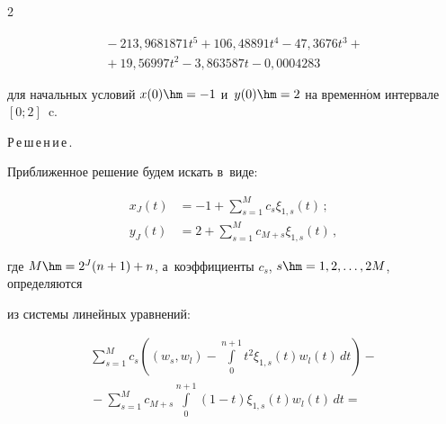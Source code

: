 \begin{multicols}{2}
\noindent


\begin{multline*}


{}-213{,}9681871 t^5 + 106{,}48891 t^4-47{,}3676 t^3+{}\\


{}+19{,}56997 t^2-3{,}863587 t-0{,}0004283


\end{multline*}










\noindent


для начальных условий $x(0)\hm=-1$ и~$y(0)\hm=2$ на вре\-мен\-н$\acute{\mbox{о}}$м интервале $[0;2]$~c.





\smallskip











\noindent


Р\,е\,ш\,е\,н\,и\,е\,.\ \ 


Приближенное решение будем искать в~виде: 


\begin{align*}


x_{J}(t)&=-1+\sum\limits_{s=1}^M 


c_{s} {\xi}_{1,s}(t)\,;\\


y_{J}(t)&=2+\sum\limits_{s=1}^M c_{M+s} {\xi}_{1,s}(t)\,, 


\end{align*}


где $M\hm=2^J(n+1)+n$, а~коэффициенты $c_s$, $s\hm=1,2,\ldots, 2M$, определяются 


из системы линейных уравнений:


\begin{multline*}


\sum\limits_{s=1}^M c_s\left((w_s,w_l)-


\int\limits_{0}^{n+1}\!t^2{\xi}_{1,s}(t)w_l(t)\,dt\right)-{}\\


{}-\sum\limits_{s=1}^M c_{M+s}\int\limits_0^{n+1}(1-t){\xi}_{1,s}(t)w_l(t)\,dt={}\\



\end{multline*}
\end{multicols}

